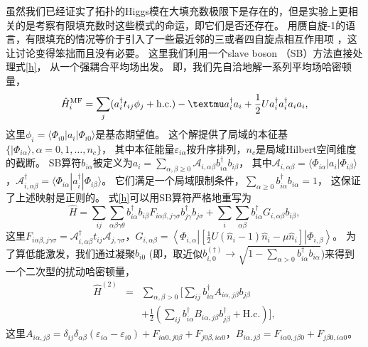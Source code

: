虽然我们已经证实了拓扑的Higgs模在大填充数极限下是存在的，但是实验上更相关的是考察有限填充数时这些模式的命运，即它们是否还存在。
用赝自旋-1的语言，有限填充的情况等价于引入了一些最近邻的三或者四自旋点相互作用项 \cite{Huber2007}，这让讨论变得笨拙而且没有必要。
这里我们利用一个slave boson （SB）方法\cite{Frerot2016}直接处理式\eqref{h}，
从一个强耦合平均场出发。
即，我们先自洽地解一系列平均场哈密顿量，
\begin{equation}
  \hat{H}_i^{\tmf} = \sum_j (a_i^{\dag} t_{i   j} \phi_j +
   \mathrm{h.c.}) - \mu a_i^{\dag} a_i +
   \frac{1}{2}U a^{\dag}_i a_i^{\dag} a_i a_i,\nonumber
\end{equation}
这里$\phi_i = \langle \Phi_{i 0} | a_i | \Phi_{i 0} \rangle$是基态期望值。
这个解提供了局域的本征基$\{ | \Phi_{i \alpha} \rangle, \alpha = 0, 1, \ldots, n_c \}$，
其中本征能量$\varepsilon_{i \alpha}$按升序排列，$n_c$是局域Hilbert空间维度的截断。
SB算符$b_{i \alpha}$被定义为$a_i = \sum_{\alpha, \beta \geqslant 0} \mathcal{A}_{i, \alpha \beta} b_{i \alpha}^{\dag} b_{i \beta}$，
其中$\mathcal{A}_{i, \alpha \beta} = \langle \Phi_{i \alpha} | a_i | \Phi_{i \beta} \rangle$，$\mathcal{A}_{i, \alpha \beta}^{\dag} = \langle \Phi_{i\alpha} | a_i^{\dag} | \Phi_{i \beta} \rangle$。
它们满足一个局域限制条件，$\sum_{\alpha \geqslant 0} b_{i \alpha}^{\dag} b_{i \alpha} = 1$，
这保证了上述映射是正则的\cite{Huerga2013}。
式\eqref{h}可以用SB算符严格地重写为
\[ \hat{H} = \sum_{i   j} \sum_{\alpha \beta \gamma \theta} b_{i
   \alpha}^{\dag} b_{i \beta} F_{i \alpha \beta, j \gamma \sigma} b_{j
   \gamma}^{\dag} b_{j \sigma} + \sum_i \sum_{\alpha \beta} b_{i
   \alpha}^{\dag} G_{i, \alpha \beta} b_{i \beta}, \]
这里$F_{i \alpha \beta, j \gamma \sigma} =\mathcal{A}_{i, \alpha \beta}^{\dag} t_{i   j} \mathcal{A}_{j, \gamma \sigma}$，$G_{i, \alpha \beta} = \left\langle \Phi_{i,\alpha} \left| \left[ \frac{1}{2}U (\hat{n}_i - 1) \hat{n}_i - \mu \hat{n}_i \right] \right| \Phi_{i, \beta} \right\rangle$。
为了算低能激发，我们通过凝聚$b_{i 0}$ (即，取近似$b_{i,0}^{(\dagger)}\rightarrow \sqrt{1-\sum_{\alpha> 0} b_{i \alpha}^{\dag} b_{i \alpha}}$)来得到一个二次型的扰动哈密顿量，
\begin{eqnarray}
      \hat{H}^{(2)} &=& \sum_{\alpha, \beta > 0} \bigg[ \sum_{i   j} b_{i
  \alpha}^{\dag} A_{i \alpha, j \beta} b_{j \beta}\nonumber\\
  && + \frac{1}{2} \left(
  \sum_{i   j} b_{i \alpha}^{\dag} B_{i \alpha, j \beta} b_{j
  \beta}^{\dag} + \text{H.c.} \right) \bigg],\nonumber
\end{eqnarray}
这里$A_{i \alpha, j \beta} = \delta_{i   j} \delta_{\alpha \beta} (\varepsilon_{i \alpha} - \varepsilon_{i 0}) + F_{i \alpha 0, j 0 \beta} + F_{j 0 \beta, i \alpha 0}$，$B_{i \alpha, j \beta} = F_{i \alpha 0, j \beta 0} + F_{j \beta 0, i \alpha 0}$。

